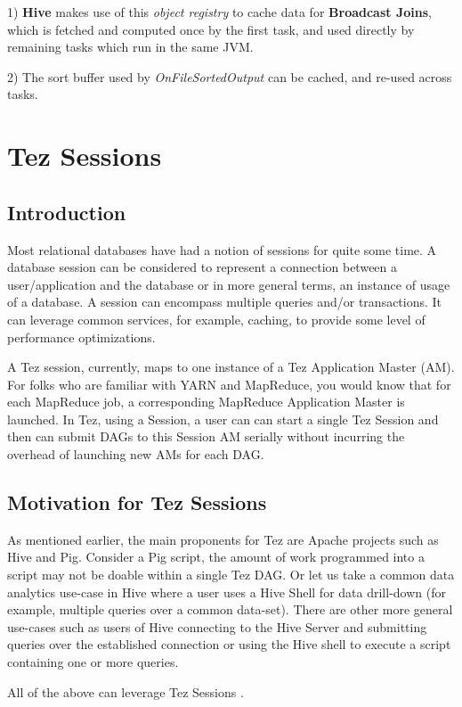 \documentclass[twocolumn]{article}
\begin{document}
1) \textbf{Hive} makes use of this \emph{object registry} to cache data
for \textbf{Broadcast Joins}, which is fetched and computed once by the
first task, and used directly by remaining tasks which run in the same
JVM.

2) The sort buffer used by \emph{OnFileSortedOutput} can be cached,
and re-used across tasks.

\section{Tez Sessions}
\subsection{Introduction}

Most relational databases have had a notion of sessions for quite some
time. A database session can be considered to represent a connection
between a user/application and the database or in more general terms, an
instance of usage of a database. A session can encompass multiple
queries and/or transactions. It can leverage common services, for
example, caching, to provide some level of performance optimizations.

A Tez session, currently, maps to one instance of a Tez Application
Master (AM). For folks who are familiar with YARN and MapReduce, you
would know that for each MapReduce job, a corresponding MapReduce
Application Master is launched. In Tez, using a Session, a user can can
start a single Tez Session and then can submit DAGs to this Session AM
serially without incurring the overhead of launching new AMs for each
DAG.

\subsection{Motivation for Tez Sessions}

As mentioned earlier, the main proponents for Tez are Apache projects
such as Hive and Pig. Consider a Pig script, the amount of work
programmed into a script may not be doable within a single Tez DAG. Or
let us take a common data analytics use-case in Hive where a user uses a
Hive Shell for data drill-down (for example, multiple queries over a
common data-set). There are other more general use-cases such as users
of Hive connecting to the Hive Server and submitting queries over the
established connection or using the Hive shell to execute a script
containing one or more queries.

All of the above can leverage Tez Sessions \cite{Saha:2013-07}.
\end{document}
